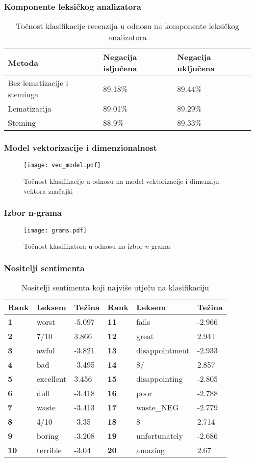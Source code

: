 \documentclass[utf8]{beamer}
\begin{document}
\begin{frame}
\frametitle{Komponente leksičkog analizatora}
\begin{table}
    \center
    \begin{tabular}{| l | l | l |}
    \hline
    Metoda & Negacija isljučena & Negacija uključena \\ \hline
    Bez lematizacije i steminga & 89.18\% & 89.44\% \\ \hline
    Lematizacija & 89.01\% & 89.29\% \\ \hline
    Steming & 88.9\% & 89.33\% \\
    \hline
    \end{tabular}
    \caption{Točnost klasifikacije recenzija u odnosu na komponente leksičkog analizatora}
\end{table}
\end{frame}

\begin{frame}
\frametitle{Model vektorizacije i dimenzionalnost}
\begin{figure}
\texttt{[image: vec\_model.pdf]}
\caption{Točnost klasifikacije u odnosu na model vektorizacije i dimenziju vektora značajki}
\end{figure}
\end{frame}

\begin{frame}
\frametitle{Izbor n-grama}
\begin{figure}
\texttt{[image: grams.pdf]}
\caption{Točnost klasifikatora u odnosu na izbor $n$-grama}
\end{figure}
\end{frame}

\begin{frame}
\frametitle{Nositelji sentimenta}
\begin{table}
    \center
    \begin{tabular}{| >{\bfseries}l | l | l | >{\bfseries}l | l | l |}
    \hline
    Rank & Leksem & Težina & Rank & Leksem & Težina\\ \hline
    1 & worst & -5.097 & 11 & fails & -2.966\\ \hline
    2 & 7/10 & 3.866 & 12 & great & 2.941\\ \hline
    3 & awful & -3.821 & 13 & disappointment & -2.933\\ \hline
    4 & bad & -3.495 & 14 & 8/ & 2.857\\ \hline
    5 & excellent & 3.456 & 15 & disappointing & -2.805\\ \hline
    6 & dull & -3.418 & 16 & poor & -2.788\\ \hline
    7 & waste & -3.413 & 17 & waste\_NEG & -2.779\\ \hline
    8 & 4/10 & -3.35 & 18 & 8 & 2.714\\ \hline
    9 & boring & -3.208 & 19 & unfortunately & -2.686\\ \hline
    10 & terrible & -3.04 & 20 & amazing & 2.67\\
    \hline
    \end{tabular}
    \caption{Nositelji sentimenta koji najviše utječu na klasifikaciju}
\end{table}
\end{frame}
\end{document}
